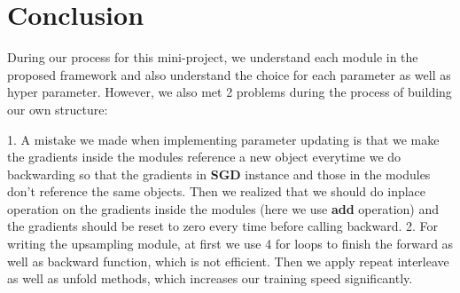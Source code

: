 \section{Conclusion}
During our process for this mini-project, we understand each module in the proposed framework and also understand the choice for each parameter as well as hyper parameter. However, we also met 2 problems during the process of building our own structure:

1. A mistake we made when implementing parameter updating is that we make the gradients inside the modules reference a new object everytime we do backwarding so that the gradients in \textbf{SGD} instance and those in the modules don't reference the same objects. Then we realized that we should do inplace operation on the gradients inside the modules (here we use \textbf{add} operation) and the gradients should be reset to zero every time before calling backward.
2. For writing the upsampling module, at first we use 4 for loops to finish the forward as well as backward function, which is not efficient. Then we apply repeat interleave as well as unfold methods, which increases our training speed significantly.